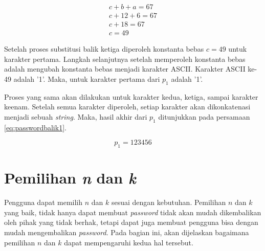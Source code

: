 \begin{align}
	c + b + a = 67 \nonumber \\
	c + 12 + 6 = 67 \nonumber \\
	c + 18 = 67 \nonumber \\
	c = 49 \label{eq:gauss8}
\end{align}

Setelah proses substitusi balik ketiga diperoleh konstanta bebas \begin{math}c=49\end{math} untuk karakter pertama. Langkah selanjutnya setelah memperoleh konstanta bebas adalah mengubah konstanta bebas menjadi karakter ASCII. Karakter ASCII ke-49 adalah '1'. Maka, untuk karakter pertama dari \begin{math}p_1\end{math} adalah '1'.

Proses yang sama akan dilakukan untuk karakter kedua, ketiga, sampai karakter keenam. Setelah semua karakter diperoleh, setiap karakter akan dikonkatenasi menjadi sebuah \textit{string}. Maka, hasil akhir dari \begin{math}p_1\end{math} ditunjukkan pada persamaan \ref{eq:passwordbalik1}.

\begin{equation}
	p_1 = 123456 \label{eq:passwordbalik1}
\end{equation}

\section{Pemilihan \textit{n} dan \textit{k}}

Pengguna dapat memilih \begin{math}n\end{math} dan \begin{math}k\end{math} sesuai dengan kebutuhan. Pemilihan \begin{math}n\end{math} dan \begin{math}k\end{math} yang baik, tidak hanya dapat membuat \textit{password} tidak akan mudah dikembalikan oleh pihak yang tidak berhak, tetapi dapat juga membuat pengguna bisa dengan mudah mengembalikan \textit{password}\cite{ellison2000protecting}. Pada bagian ini, akan dijelaskan bagaimana pemilihan \begin{math}n\end{math} dan \begin{math}k\end{math} dapat mempengaruhi kedua hal tersebut.

